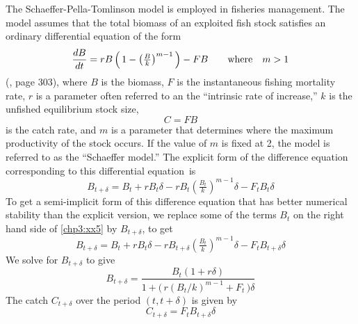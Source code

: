\documentclass{admbmanual}
\begin{document}
The Schaeffer-Pella-Tomlinson model is employed in fisheries management. The
model assumes that the total biomass of an exploited fish stock satisfies an
ordinary differential equation of the form
\begin{equation}
\frac{dB}{dt}=rB\left(\,1-\left(\tfrac{B}{k}\right)^{m-1}\,\right)
           - FB  \qquad \hbox{\rm where}\quad m>1
\label{chp3:xx3}
\end{equation}
(\cite{hilbornwalters1991}, page 303), where $B$ is the biomass, $F$ is the
instantaneous fishing mortality rate, $r$ is a parameter often referred to an
the ``intrinsic rate of increase,'' $k$ is the unfished equilibrium stock size,
\begin{equation}
  {C=FB}
\label{chp3:xx4}
\end{equation}
is the catch rate, and $m$ is a parameter that determines where the maximum
productivity of the stock occurs. If the value of $m$ is fixed at 2, the model
is referred to as the ``Schaeffer model.'' The explicit form of the difference
equation corresponding to this differential equation~is
\begin{equation}
  {B_{t+\delta}=B_t+rB_t\delta-rB_t\left(\tfrac{B_t}{k}\right)^{m-1}\delta
     - F_tB_t\delta}
  \label{chp3:xx5}
\end{equation}
To get a semi-implicit form of this difference equation that has better
numerical stability than the explicit version, we replace some of the terms
$B_t$ on the right hand side of \ref{chp3:xx5} by $B_{t+\delta}$, to get
\begin{equation}
{B_{t+\delta}
   =B_t+rB_t\delta-rB_{t+\delta}\left(\tfrac{B_t}{k}\right)^{m-1}\delta
     - F_tB_{t+\delta}\delta}
 \label{chp3:xx6}
\end{equation}
We solve for $B_{t+\delta}$ to give
\begin{equation}
{B_{t+\delta}
   =\frac{B_t(1+r\delta)}{1+\big(\,r(B_t/k)^{m-1}+F_t\,\big)\delta}}
  \label{chp3:xx7}
\end{equation}
The catch $C_{t+\delta}$ over the period $(t,t+\delta)$ is given by
\begin{equation}
 {C_{t+\delta} =F_tB_{t+\delta}\delta }
  \label{chp3:xx8}
\end{equation}
\end{document}
